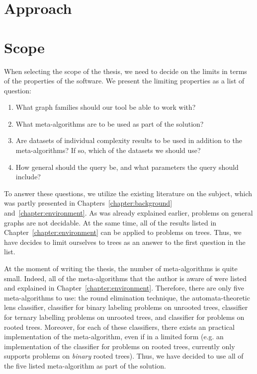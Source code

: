 \section{Approach}



\section{Scope}

When selecting the scope of the thesis, we need to decide on the limits
in terms of the properties of the software. We present the limiting properties
as a list of question:

\begin{enumerate}
  \item What graph families should our tool be able to work with?
  \item What meta-algorithms are to be used as part of the solution?
  \item Are datasets of individual complexity results to be used
  in addition to the meta-algorithms? If so, which of the datasets we should use?
  \item How general should the query be, and what parameters the query should include?
\end{enumerate}

To answer these questions, we utilize the existing literature on the subject, which was partly presented in Chapters~\ref{chapter:background} and~\ref{chapter:environment}. As was already explained earlier, problems on general graphs are not decidable. At the same time, all of the results listed in Chapter~\ref{chapter:environment} can be applied to problems on trees. Thus,
we have decides to limit ourselves to trees as an answer to the first question in the list.

At the moment of writing the thesis, the number of meta-algorithms is
quite small. Indeed, all of the meta-algorithms that the author is aware of were listed and explained in Chapter~\ref{chapter:environment}. Therefore, there are only five meta-algorithms to use: the round elimination technique, the automata-theoretic lens classifier, classifier for binary labeling problems on unrooted trees, classifier for ternary labelling problems on unrooted trees, and classifier for problems on rooted trees. Moreover, for each of these classifiers, there exists an practical implementation of the meta-algorithm, even if in a limited form (e.g. an implementation of the classifier for problems on rooted trees, currently only supports problems on \emph{binary} rooted trees). Thus, we have decided to use all of the five listed meta-algorithm as part of the solution.

